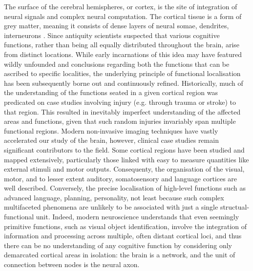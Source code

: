 The surface of the cerebral hemispheres, or cortex, is the site of integration of neural signals and complex neural computation.
The cortical tissue is a form of grey matter, meaning it consists of dense layers of neural somae, dendrites, interneurons .
Since antiquity  scientists suspected that various cognitive functions, rather than being all equally distributed throughout the brain, arise from distinct locations.
While early incarnations of this idea may have featured wildly unfounded and  conclusions regarding both the functions that can be ascribed to specific localities, the underlying principle of functional localisation has been subsequently borne out and continuously refined.
Historically, much of the understanding of the functions seated in a given cortical region was predicated on case studies involving injury (e.g. through trauma or stroke) to that region.
This resulted in inevitably imperfect understanding of the affected areas and functions, given that such random injuries invariably span multiple functional regions. 
Modern non-invasive imaging techniques  have vastly accelerated our study of the brain, however, clinical case studies remain significant contributors to the field. 
Some cortical regions have been studied and mapped extensively, particularly those linked with easy to measure quantities like external stimuli and motor outputs.
Consequenty, the organisation of the visual, motor, and to lesser extent  auditory, somatosensory and  language cortices are well described.
Conversely, the precise localisation of high-level functions such as advanced language, planning, personality, not least because such complex multifaceted phenomena are unlikely to be associated with just a single structual-functional unit.
Indeed, modern neuroscience understands that even seemingly primitive functions, such as visual object identification, involve the integration of information and processing across multiple, often distant cortical loci, and thus there can be no understanding of any cognitive function by considering only  demarcated cortical areas in isolation: the brain is a network, and the unit of connection between nodes is the neural axon.

